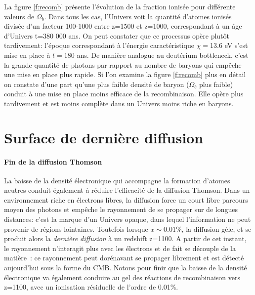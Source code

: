 La figure \ref{f:recomb} présente l'évolution de la fraction ionisée pour différente valeurs de $\Omega_b$. Dans tous les cas, l'Univers voit la quantité d'atomes ionisés divisée d'un facteur 100-1000 entre z=1500 et z=1000, correspondant à un âge d'Univers t=380 000 ans. On peut constater que ce processus opère plutôt tardivement: l'époque correspondant à l'énergie caractéristique $\chi=$13.6 eV s'est mise en place à $t=180$ ans. De manière analogue au deutérium bottleneck, c'est la grande quantité de photons par rapport au nombre de baryons  qui empêche une mise en place plus rapide. Si l'on examine la figure \ref{f:recomb} plus en détail on constate d'une part qu'une plus faible densité de baryon ($\Omega_b$ plus faible) conduit à une mise en place moins efficace de la recombinaison. Elle opère plus tardivement et est moins complète dans un Univers moins riche en baryons.

\section{Surface de dernière diffusion}

\paragraph{Fin de la diffusion Thomson} La baisse de la densité électronique qui accompagne la formation d'atomes neutres conduit également à réduire l'efficacité de la diffusion Thomson. Dans un environnement riche en électrons libres, la diffusion force un court libre parcours moyen des photons et empêche le rayonnement de se propager sur de longues distances: c'est la marque d'un Univers opaque, dans lequel l'information ne peut provenir de régions lointaines.  Toutefois lorsque $x\sim 0.01\%$, la diffusion gèle, et se produit alors la \textit{dernière diffusion} à un redshift z=1100. A partir de cet instant, le rayonnement n'interagit plus avec les électrons et de fait se découple de la matière~: ce rayonnement peut dorénavant se propager librement et est détecté aujourd'hui sous la forme du CMB. Notons pour finir que la baisse de la densité électronique va également conduire au gel des réactions de recombinaison vers z=1100, avec un ionisation résiduelle de l'ordre de 0.01\%.



